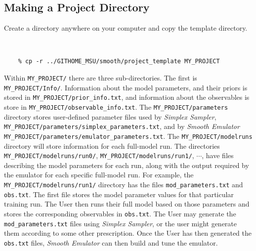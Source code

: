 \documentclass[main.tex]{subfiles}
\begin{document}
\subsection{Making a Project Directory}

Create a directory anywhere on your computer and copy the template directory.
{\tt 
\begin{verbatim}
    % cp -r ../GITHOME_MSU/smooth/project_template MY_PROJECT
\end{verbatim}
}
Within {\tt MY\_PROJECT/} there are three sub-directories. The first is {\tt MY\_PROJECT/Info/}. Information about the model parameters, and their priors is stored in {\tt MY\_PROJECT/prior\_info.txt}, and information about the observables is store in {\tt MY\_PROJECT/observable\_info.txt}. The {\tt MY\_PROJECT/parameters} directory stores user-defined parameter files used by {\it Simplex Sampler}, {\tt MY\_PROJECT/parameters/simplex\_parameters.txt}, and by {\it Smooth Emulator} {\tt MY\_PROJECT/parameters/emulator\_parameters.txt}. The {\tt MY\_PROJECT/modelruns} directory will store information for each full-model run. The directories
{\tt  MY\_PROJECT/modelruns/run0/}, {\tt  MY\_PROJECT/modelruns/run1/}, $\cdots$, have files describing the model parameters for each run, along with the output required by the emulator for each specific full-model run. For example, the {\tt  MY\_PROJECT/modelruns/run1/} directory has the files {\tt mod\_parameters.txt} and {\tt obs.txt}. The first file stores the model parameter values for that particular training run. The User then runs their full model based on those parameters and stores the corresponding observables in {\tt obs.txt}. The User may generate the {\tt mod\_parameters.txt} files using {\it Simplex Sampler}, or the user might generate them according to some other prescription. Once the User has then generated the {\tt obs.txt} files, {\it Smooth Emulator} can then build and tune the emulator.
\end{document}
